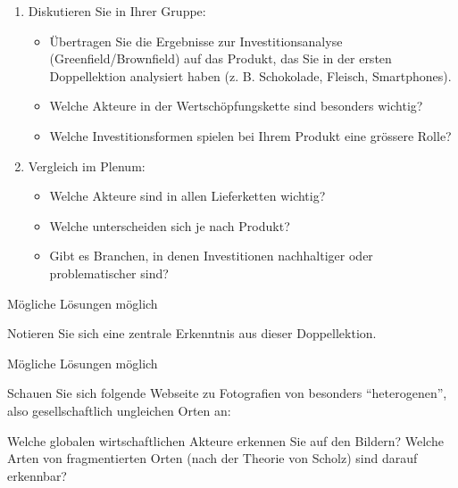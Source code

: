 \begin{myexercise}
    \begin{enumerate}
        \item Diskutieren Sie in Ihrer Gruppe:
              \begin{itemize}
                  \item Übertragen Sie die Ergebnisse zur Investitionsanalyse (Greenfield/Brownfield) auf das Produkt, das Sie in der ersten Doppellektion analysiert haben (z. B. Schokolade, Fleisch, Smartphones).
                  \item Welche Akteure in der Wertschöpfungskette sind besonders wichtig?
                  \item Welche Investitionsformen spielen bei Ihrem Produkt eine grössere Rolle?
              \end{itemize}
        \item Vergleich im Plenum:
              \begin{itemize}
                  \item Welche Akteure sind in allen Lieferketten wichtig?
                  \item Welche unterscheiden sich je nach Produkt?
                  \item Gibt es Branchen, in denen Investitionen nachhaltiger oder problematischer sind?
              \end{itemize}
    \end{enumerate}
    \begin{myanswer}
        Mögliche Lösungen möglich
    \end{myanswer}
\end{myexercise}
\begin{myexercise}
    Notieren Sie sich eine zentrale Erkenntnis aus dieser Doppellektion.

    \begin{myanswer}
        Mögliche Lösungen möglich
    \end{myanswer}
\end{myexercise}

\begin{mychallenge}
    Schauen Sie sich folgende Webseite zu Fotografien von besonders ``heterogenen'', also gesellschaftlich ungleichen Orten an:


    Welche globalen wirtschaftlichen Akteure erkennen Sie auf den Bildern? Welche Arten von fragmentierten Orten (nach der Theorie von Scholz) sind darauf erkennbar?
\end{mychallenge}

